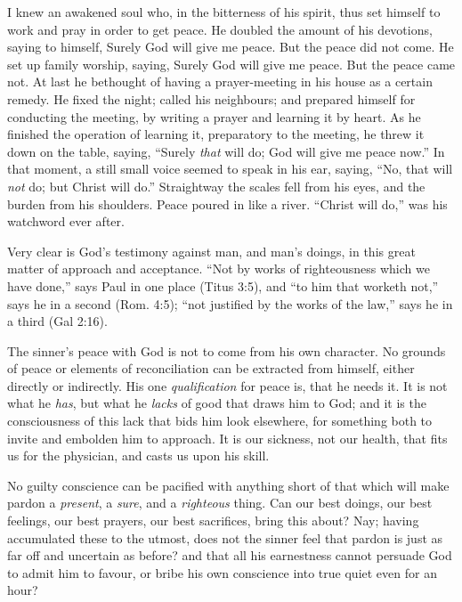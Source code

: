 \documentclass[
]{book}
\begin{document}
I knew an awakened soul who, in the bitterness of his spirit, thus set himself to work and pray in order to get peace. He doubled the amount of his devotions, saying to himself, Surely God will give me peace. But the peace did not come. He set up family worship, saying, Surely God will give me peace. But the peace came not. At last he bethought of having a prayer-meeting in his house as a certain remedy. He fixed the night; called his neighbours; and prepared himself for conducting the meeting, by writing a prayer and learning it by heart. As he finished the operation of learning it, preparatory to the meeting, he threw it down on the table, saying, ``Surely \emph{that} will do; God will give me peace now.'' In that moment, a still small voice seemed to speak in his ear, saying, ``No, that will \emph{not} do; but Christ will do.'' Straightway the scales fell from his eyes, and the burden from his shoulders. Peace poured in like a river. ``Christ will do,'' was his watchword ever after.

Very clear is God's testimony against man, and man's doings, in this great matter of approach and acceptance. ``Not by works of righteousness which we have done,'' says Paul in one place (Titus 3:5), and ``to him that worketh not,'' says he in a second (Rom. 4:5); ``not justified by the works of the law,'' says he in a third (Gal 2:16).

The sinner's peace with God is not to come from his own character. No grounds of peace or elements of reconciliation can be extracted from himself, either directly or indirectly. His one \emph{qualification} for peace is, that he needs it. It is not what he \emph{has}, but what he \emph{lacks} of good that draws him to God; and it is the consciousness of this lack that bids him look elsewhere, for something both to invite and embolden him to approach. It is our sickness, not our health, that fits us for the physician, and casts us upon his skill.

No guilty conscience can be pacified with anything short of that which will make pardon a \emph{present}, a \emph{sure}, and a \emph{righteous} thing. Can our best doings, our best feelings, our best prayers, our best sacrifices, bring this about? Nay; having accumulated these to the utmost, does not the sinner feel that pardon is just as far off and uncertain as before? and that all his earnestness cannot persuade God to admit him to favour, or bribe his own conscience into true quiet even for an hour?
\end{document}
